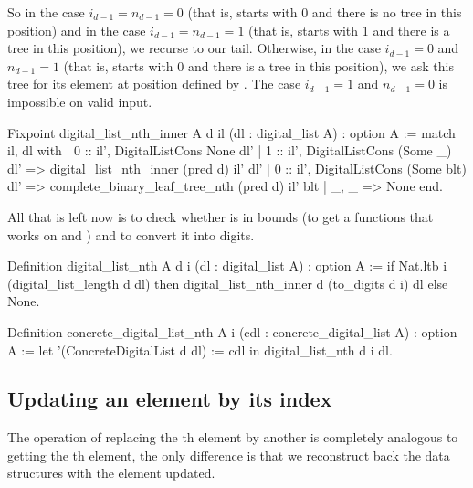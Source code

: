 \documentclass{article}
\begin{document}
So in the case $i_{d - 1} = n_{d - 1} = 0$ (that is,  starts with 0 and there is no tree in this position) and in the case $i_{d - 1} = n_{d - 1} = 1$ (that is,  starts with 1 and there is a tree in this position), we recurse to our tail. Otherwise, in the case $i_{d - 1} = 0$ and $n_{d - 1} = 1$ (that is,  starts with 0 and there is a tree in this position), we ask this tree for its element at position defined by . The case $i_{d - 1} = 1$ and $n_{d - 1} = 0$ is impossible on valid input.

\begin{coq}
Fixpoint digital_list_nth_inner {A} d il (dl : digital_list A) : option A :=
  match il, dl with
  | 0 :: il', DigitalListCons None dl'
  | 1 :: il', DigitalListCons (Some _) dl' => digital_list_nth_inner (pred d) il' dl'
  | 0 :: il', DigitalListCons (Some blt) dl' => complete_binary_leaf_tree_nth (pred d) il' blt
  | _, _ => None
  end.
\end{coq}

All that is left now is to check whether  is in bounds (to get a functions that works on and ) and to convert it into digits.

\begin{coq}
Definition digital_list_nth {A} d i (dl : digital_list A) : option A :=
  if Nat.ltb i (digital_list_length d dl)
  then digital_list_nth_inner d (to_digits d i) dl
  else None.

Definition concrete_digital_list_nth {A} i (cdl : concrete_digital_list A) : option A :=
  let '(ConcreteDigitalList d dl) := cdl in digital_list_nth d i dl.
\end{coq}

\subsection{Updating an element by its index}

The operation of replacing the th element by another  is completely analogous to getting the th element, the only difference is that we reconstruct back the data structures with the element updated.
\end{document}

